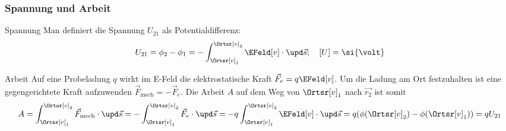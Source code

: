 \begin{frame}
  \frametitle{Spannung und Arbeit}
  \begin{block}{Spannung}
    Man definiert die
    \alert{Spannung} $U_{21}$ als \alert{Potentialdifferenz}:
    $$
    U_{21} = \phi_2 - \phi_1 = - \int_{\Ortsr[v]_1}^{\Ortsr[v]_2}
    \EFeld[v]\cdot \upd \vec{s}; \quad [U] = \si{\volt}
    $$
    \end{block}
    \begin{block}{Arbeit}
      Auf eine Probeladung $q$ wirkt im E-Feld die elektrostatische
      Kraft $\vec{F}_e = q\EFeld[v]$. Um die Ladung am Ort
      festzuhalten ist eine gegengerichtete Kraft aufzuwenden
      $\vec{F}_\text{mech} = -\vec{F}_e$. Die \alert{Arbeit} $A$
      auf dem Weg von $\Ortsr[v]_1$ nach $\vec{r_2}$ ist somit
      $$
      A = \int_{\Ortsr[v]_1}^{\Ortsr[v]_2}
      \vec{F}_\text{mech}\cdot\upd\vec{s} = - \int_{\Ortsr[v]_1}^{\Ortsr[v]_2}
      \vec{F}_e\cdot\upd\vec{s} = -q\int_{\Ortsr[v]_1}^{\Ortsr[v]_2}
      \EFeld[v]\cdot\upd\vec{s} = q (\phi(\Ortsr[v]_2)-\phi({\Ortsr[v]_1)})
      = q U_{21}  
      $$
     
    \end{block}
\end{frame}



